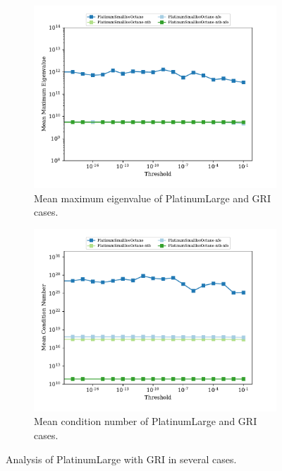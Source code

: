 \documentclass{article}
\begin{document}
\begin{figure}[htb]
    \begin{subfigure}{0.49\textwidth}
        \centering
        \includegraphics[width=\textwidth]{figures/max_eigen_isooctane_small.pdf}
        \caption{Mean maximum eigenvalue of PlatinumLarge and GRI cases.}
        \label{fig:isooctane_small_me}
    \end{subfigure}
    \hfill
    \begin{subfigure}{0.49\textwidth}
        \centering
        \includegraphics[width=\textwidth]{figures/condition_isooctane_small.pdf}
        \caption{Mean condition number of PlatinumLarge and GRI cases.}
        \label{fig:isooctane_small_iters}
    \end{subfigure}
    \hfill
    \caption{Analysis of PlatinumLarge with GRI in several cases.}
    \label{fig:isooctane_small}
\end{figure}
\end{document}
